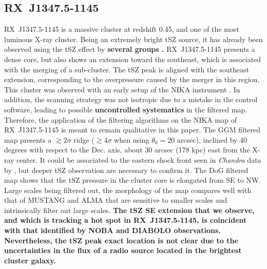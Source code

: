 \documentclass[twocolumn,traditabstract]{aa}
\begin{document}
\subsection{RX~J1347.5-1145}\label{sec:RXJ1347.5-1145}
\mbox{RX~J1347.5-1145} is a massive cluster at redshift 0.45, and one of the most luminous X-ray cluster. Being an extremely bright tSZ source, it has already been observed using the tSZ effect by {\bf several groups \citep[e.g.][]{Komatsu1999,Pointecouteau1999,Kitayama2004,Mason2010,Plagge2012,Adam2014,Sayers2016,Kitayama2016}.} \mbox{RX~J1347.5-1145} presents a dense core, but also shows an extension toward the southeast, which is associated with the merging of a sub-cluster. The tSZ peak is aligned with the southeast extension, corresponding to the overpressure caused by the merger in this region. This cluster was observed with an early setup of the NIKA instrument \citep[bandpass, sensitivity, calibration procedure, see][for more details]{Adam2014}. In addition, the scanning strategy was not isotropic due to a mistake in the control software, leading to possible {\bf uncontrolled systematics} in the filtered map. Therefore, the application of the filtering algorithms on the NIKA map of \mbox{RX~J1347.5-1145} is meant to remain qualitative in this paper. The GGM filtered map presents a $\gtrsim 2 \sigma$ ridge ($\gtrsim 4 \sigma$ when using $\theta_0 = 20$ arcsec), inclined by 40 degrees with respect to the Dec. axis, about 30 arcsec (178 kpc) east from the X-ray center. It could be associated to the eastern shock front seen in \textit{Chandra} data by \cite{Kreisch2016}, but deeper tSZ observation are necessary to confirm it. The DoG filtered map shows that the tSZ pressure in the cluster core is elongated from SE to NW. Large scales being filtered out, the morphology of the map compares well with that of MUSTANG \citep{Mason2010} and ALMA \citep{Kitayama2016} that are sensitive to smaller scales and intrinsically filter out large scales. {\bf The tSZ SE extension that we observe, and which is tracking a hot spot in \mbox{RX~J1347.5-1145}, is coincident with that identified by NOBA \citep[Nobeyama Bolometer Array][]{Kitayama2004} and DIABOLO \citep[on the IRAM 30m telescope][]{Pointecouteau1999,Pointecouteau2001} observations. Nevertheless, the tSZ peak exact location is not clear due to the uncertainties in the flux of a radio source located in the brightest cluster galaxy.}

\end{document}
